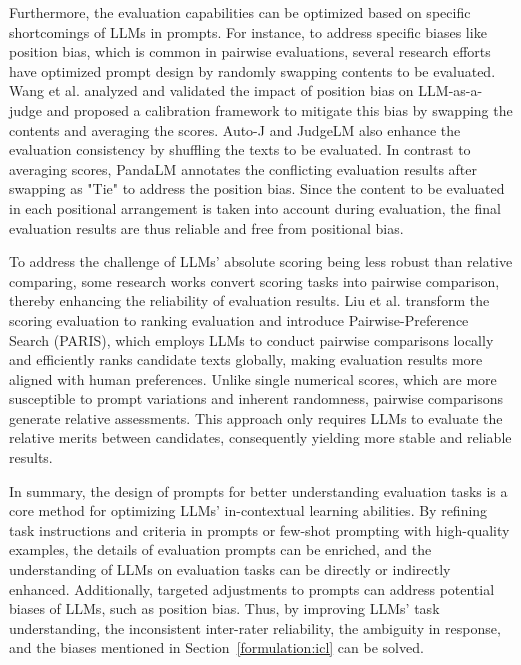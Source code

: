 Furthermore, the evaluation capabilities can be optimized based on specific shortcomings of LLMs in prompts. For instance, to address specific biases like position bias, which is common in pairwise evaluations, several research efforts have optimized prompt design by randomly swapping contents to be evaluated.
Wang et al.\cite{wang-etal-2024-large-language-models-fair} analyzed and validated the impact of position bias on LLM-as-a-judge and proposed a calibration framework to mitigate this bias by swapping the contents and averaging the scores. Auto-J\cite{auto-j} and JudgeLM\cite{zhu2023judgelm} also enhance the evaluation consistency by shuffling the texts to be evaluated. In contrast to averaging scores, PandaLM\cite{wang2023pandalm} annotates the conflicting evaluation results after swapping as "Tie" to address the position bias.
Since the content to be evaluated in each positional arrangement is taken into account during evaluation, the final evaluation results are thus reliable and free from positional bias.

To address the challenge of LLMs' absolute scoring being less robust than relative comparing\cite{raina2024llm}, some research works convert scoring tasks into pairwise comparison, thereby enhancing the reliability of evaluation results. 
Liu et al.\cite{liu2024aligning} transform the scoring evaluation to ranking evaluation and introduce Pairwise-Preference Search (PARIS), which employs LLMs to conduct pairwise comparisons locally and efficiently ranks candidate texts globally, making evaluation results more aligned with human preferences.
Unlike single numerical scores, which are more susceptible to prompt variations and inherent randomness, pairwise comparisons generate relative assessments. This approach only requires LLMs to evaluate the relative merits between candidates, consequently yielding more stable and reliable results.

In summary, the design of prompts for better understanding evaluation tasks is a core method for optimizing LLMs' in-contextual learning abilities. 
By refining task instructions and criteria in prompts or few-shot prompting with high-quality examples, the details of evaluation prompts can be enriched, and the understanding of LLMs on evaluation tasks can be directly or indirectly enhanced. Additionally, targeted adjustments to prompts can address potential biases of LLMs, such as position bias. Thus, by improving LLMs' task understanding, the inconsistent inter-rater reliability, the ambiguity in response, and the biases mentioned in Section~\ref{formulation:icl} can be solved. 




